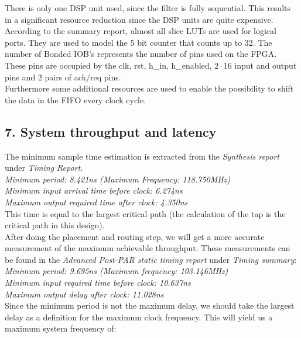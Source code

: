 \documentclass[a4paper,twoside,11pt, fleqn]{article}
\begin{document}
There is only one DSP unit used, since the filter is fully sequential. This results in a significant resource reduction since the DSP units are quite expensive. According to the summary report, almost all slice LUTs are used for logical ports. They are used to model the 5 bit counter that counts up to 32. The number of Bonded IOB's represents the number of pins used on the FPGA. These pins are occupied by the clk, rst, h\_in, h\_enabled,  $2\cdot 16$ input and output pins and 2 pairs of ack/req pins.\\

Furthermore some additional resources are used to enable the possibility to shift the data in the FIFO every clock cycle.

\subsection*{7. System throughput and latency}
The minimum sample time estimation is extracted from the \textit{Synthesis report} under \textit{Timing Report}.\\

   \textit{Minimum period: 8.421ns (Maximum Frequency: 118.750MHz)\\
   Minimum input arrival time before clock: 6.274ns\\
   Maximum output required time after clock: 4.350ns}\\

This time is equal to the largest critical path (the calculation of the tap is the critical path in this design).\\

After doing the placement and routing step, we will get a more accurate measurement of the maximum achievable throughput. These measurements can be found in the \textit{Advanced Post-PAR static timing report} under \textit{Timing summary}:\\

   \textit{Minimum period:   9.695ns   (Maximum frequency: 103.146MHz)\\
   Minimum input required time before clock:  10.637ns\\
   Maximum output delay after clock:  11.028ns}\\

Since the minimum period is not the maximum delay, we should take the largest 
delay as a definition for the maximum clock frequency. This will yield us a maximum system frequency of:\\
\end{document}
